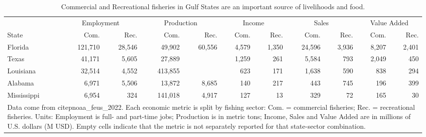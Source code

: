 \begingroup\footnotesize
\begin{table}
\centering
\caption{\label{tab:fishery_stats}Commercial and Recreational fisheries in Gulf States are an important source of livelihoods and food.}
\centering
\begin{tabular}[t]{lrrrrrrrrrr}
\toprule
\multicolumn{1}{c}{ } & \multicolumn{2}{c}{Employment} & \multicolumn{2}{c}{Production} & \multicolumn{2}{c}{Income} & \multicolumn{2}{c}{Sales} & \multicolumn{2}{c}{Value Added} \\
\cmidrule(l{3pt}r{3pt}){2-3} \cmidrule(l{3pt}r{3pt}){4-5} \cmidrule(l{3pt}r{3pt}){6-7} \cmidrule(l{3pt}r{3pt}){8-9} \cmidrule(l{3pt}r{3pt}){10-11}
State & Com. & Rec. & Com. & Rec. & Com. & Rec. & Com. & Rec. & Com. & Rec.\\
\midrule
Florida & 121,710 & 28,546 & 49,902 & 60,556 & 4,579 & 1,350 & 24,596 & 3,936 & 8,207 & 2,401\\
Texas & 41,171 & 5,605 & 27,889 &  & 1,259 & 261 & 5,584 & 793 & 2,049 & 450\\
Louisiana & 32,514 & 4,552 & 413,855 &  & 623 & 171 & 1,638 & 590 & 838 & 294\\
Alabama & 6,971 & 5,506 & 13,872 & 8,685 & 140 & 217 & 443 & 745 & 196 & 399\\
Mississippi & 6,954 & 324 & 141,018 & 4,917 & 127 & 13 & 329 & 72 & 165 & 30\\
\bottomrule
\multicolumn{11}{l}{\rule{0pt}{1em}Data come from citep{noaa_feus_2022}. Each economic metric is split by fishing sector: Com. = commercial fisheries; Rec. = recreational fisheries. Units: Employment is full- and part-time jobs; Production is in metric tons; Income, Sales and Value Added are in millions of U.S. dollars (M USD). Empty cells indicate that the metric is not separately reported for that state-sector combination.}\\
\end{tabular}
\end{table}
\endgroup
